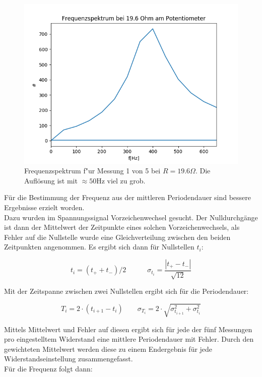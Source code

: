\documentclass[12pt,a4paper]{article}
\begin{document}
\begin{figure}
\begin{center}
\includegraphics[scale=0.75]{Bilder/fft_19,6Ohm}
\end{center}
\caption{Frequenzspektrum f"ur Messung 1 von 5 bei $R=19.6 \Omega$. Die Auflösung ist mit $\approx 50$Hz viel zu grob.}
\label{fig:Fourier19,6}
\end{figure}

Für die Bestimmung der Frequenz aus der mittleren Periodendauer sind bessere Ergebnisse erzielt worden.\\
Dazu wurden im Spannungssignal Vorzeichenwechsel gesucht. Der Nulldurchgänge ist dann der Mittelwert der Zeitpunkte eines solchen Vorzeichenwechsels, als Fehler auf die Nullstelle wurde eine Gleichverteilung zwischen den beiden Zeitpunkten angenommen. Es ergibt sich dann für Nullstellen $t_i$:

\begin{equation}
t_i=(t_++t_-)/2 \quad \quad \quad
\sigma_{t_i}=\frac{|t_+-t_-|}{\sqrt{12}}
\end{equation}

Mit der Zeitspanne zwischen zwei Nullstellen ergibt sich für die Periodendauer:

\begin{equation}
T_i=2\cdot (t_{i+1}-t_i) \quad \quad
\sigma_{T_i}=2\cdot \sqrt{\sigma_{t_{i+1}}^2+\sigma_{t_i}^2}
\end{equation}

Mittels Mittelwert und Fehler auf diesen ergibt sich für jede der fünf Messungen pro eingestelltem Widerstand eine mittlere Periodendauer mit Fehler. Durch den gewichteten Mittelwert werden diese zu einem Endergebnis für jede Widerstandseinstellung zusammengefasst.\\
Für die Frequenz folgt dann:
\end{document}

